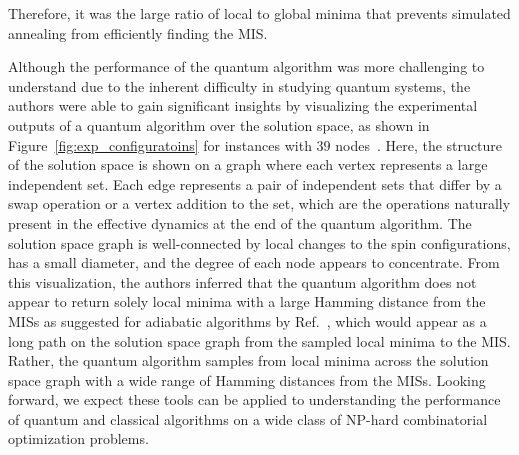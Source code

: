 \documentclass[onefignum, onetabnum]{siamart190516}
\newcommand{\<}{\langle}
\renewcommand{\>}{\rangle}
\begin{document}
Therefore, it was the large ratio of local to global minima that prevents simulated annealing from efficiently finding the MIS.

Although the performance of the quantum algorithm was more challenging to understand due to the inherent difficulty in studying quantum systems, the authors were able to gain significant insights by visualizing the experimental outputs of a quantum algorithm over the solution space, as shown in Figure~\ref{fig:exp_configuratoins} for instances with $39$ nodes~\cite{Ebadi2022}.
Here, the structure of the solution space is shown on a graph where each vertex represents a large independent set. Each edge represents a pair of independent sets that differ by a swap operation or a vertex addition to the set, which are the operations naturally present in the effective dynamics at the end of the quantum algorithm. 
The solution space graph is well-connected by local changes to the spin configurations, has a small diameter, and the degree of each node appears to concentrate. 
From this visualization, the authors inferred that the quantum algorithm does not appear to return solely local minima with a large Hamming distance from the MISs as suggested for adiabatic algorithms by Ref.~\cite{altshuler2010}, which would appear as a long path on the solution space graph from the sampled local minima to the MIS. Rather, the quantum algorithm samples from local minima across the solution space graph with a wide range of Hamming distances from the MISs.
Looking forward, we expect these tools can be applied to understanding the performance of quantum and classical algorithms on a wide class of NP-hard combinatorial optimization problems.
\end{document}
